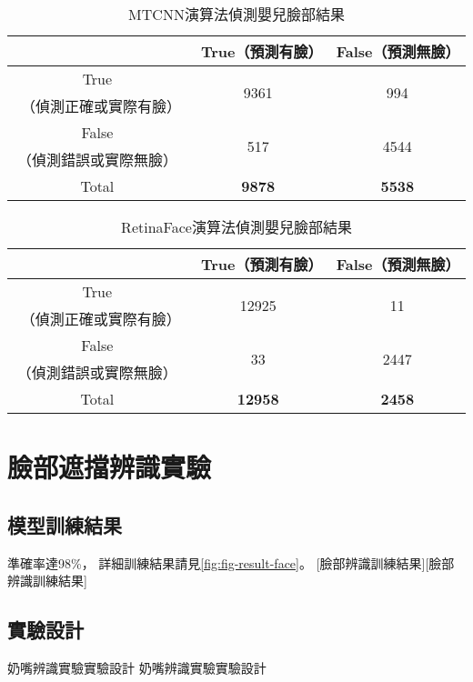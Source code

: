 \documentclass[class=NCU_thesis, crop=false]{standalone}
\begin{document}
\begin{table}[h]
    \centering
    \caption{MTCNN演算法偵測嬰兒臉部結果}
    \label{table:table-mtcnn}
    \begin{tabular}{ccc}
    \hline
     & True（預測有臉）　& False（預測無臉） \\
    \hline
    True & \multirow{2}{*}{9361} & \multirow{2}{*}{994} \\
    （偵測正確或實際有臉）　 & & \\
    False & \multirow{2}{*}{517} & \multirow{2}{*}{4544} \\
    （偵測錯誤或實際無臉） &  & \\
    \hline
    Total & \textbf{9878} & \textbf{5538} \\
    \hline
    \end{tabular}
\end{table}

\begin{table}[h]
    \centering
    \caption{RetinaFace演算法偵測嬰兒臉部結果}
    \label{table:table-retinaface}
    \begin{tabular}{ccc}
    \hline
     & True（預測有臉）　& False（預測無臉） \\
    \hline
    True & \multirow{2}{*}{12925} & \multirow{2}{*}{11} \\
    （偵測正確或實際有臉）　 & & \\
    False & \multirow{2}{*}{33} & \multirow{2}{*}{2447} \\
    （偵測錯誤或實際無臉） &  & \\
    \hline
    Total & \textbf{12958} & \textbf{2458} \\
    \hline
    \end{tabular}
\end{table}

\section{臉部遮擋辨識實驗}
\subsection{模型訓練結果}
準確率達98\%，
詳細訓練結果請見\cref{fig:fig-result-face}。
[臉部辨識訓練結果][臉部辨識訓練結果]

\subsection{實驗設計}
奶嘴辨識實驗實驗設計 奶嘴辨識實驗實驗設計
\end{document}
